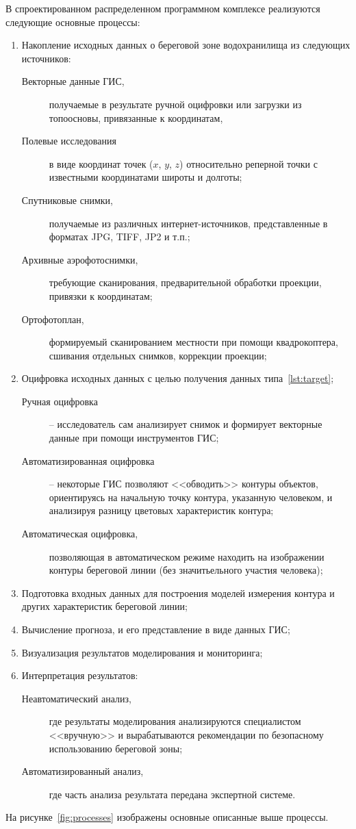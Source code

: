 \documentclass[732,fontsize=14pt,final]{studrep}
\begin{document}
В спроектированном распределенном программном комплексе реализуются следующие основные процессы:
\begin{enumerate}
  \item Накопление исходных данных о береговой зоне водохранилища из следующих источников:
  \begin{description}
    \item [Векторные данные ГИС,] получаемые в результате ручной оцифровки или загрузки из топоосновы, привязанные к координатам, \label{lst:target}
    \item [Полевые исследования] в виде координат точек ($x$, $y$, $z$) относительно реперной точки с известными координатами широты и долготы;
    \item [Спутниковые снимки,] получаемые из различных интернет-источников, представленные в форматах JPG, TIFF, JP2 и т.п.;
    \item [Архивные аэрофотоснимки,] требующие сканирования, предварительной обработки проекции, привязки к координатам;
    \item [Ортофотоплан,] формируемый сканированием местности при помощи квадрокоптера, сшивания отдельных снимков, коррекции проекции;
  \end{description}
  \item Оцифровка исходных данных с целью получения данных типа~\ref{lst:target};
  \begin{description}
    \item[Ручная оцифровка] -- исследователь сам анализирует снимок и формирует векторные данные при помощи инструментов ГИС;
    \item[Автоматизированная оцифровка] -- некоторые ГИС позволяют <<обводить>> контуры объектов, ориентируясь на начальную точку контура, указанную человеком, и анализируя разницу цветовых характеристик контура;
    \item[Автоматическая оцифровка,] позволяющая в автоматическом режиме находить на изображении контуры береговой линии (без значитьельного участия человека);
  \end{description}
  \item Подготовка входных данных для построения моделей измерения контура и других характеристик береговой линии;
  \item Вычисление прогноза, и его представление в виде данных ГИС;
  \item Визуализация результатов моделирования и мониторинга;
  \item Интерпретация результатов:
  \begin{description}
    \item[Неавтоматический анализ,] где результаты моделирования анализируются специалистом <<вручную>> и вырабатываются рекомендации по безопасному использованию береговой зоны;
    \item[Автоматизированный анализ,] где часть анализа результата передана экспертной системе.
  \end{description}
\end{enumerate}
На рисунке~\ref{fig:processes} изображены основные описанные выше процессы.
\end{document}
